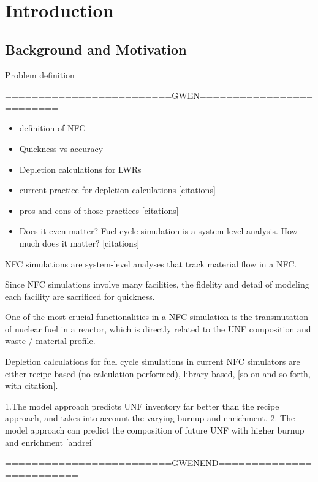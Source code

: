 \section{Introduction}
\subsection{Background and Motivation}
Problem definition

=========================GWEN=========================
\begin{itemize}
    \item definition of NFC
    \item Quickness vs accuracy
    \item Depletion calculations for LWRs
    \item current practice for depletion calculations [citations]
    \item pros and cons of those practices [citations]
    \item Does it even matter? Fuel cycle simulation is a system-level analysis. How much does it matter? [citations]
\end{itemize}


\gls{NFC} simulations are system-level analyses that track
material flow in a \gls{NFC}. 

Since \gls{NFC} simulations
involve many facilities, the fidelity and detail of modeling each
facility are sacrificed for quickness. 

One of the most crucial functionalities in a \gls{NFC}
simulation is the transmutation of nuclear fuel in a reactor,
which is directly related to the \gls{UNF} composition
and waste / material profile.

Depletion calculations for fuel cycle simulations in current
\gls{NFC} simulators are either
recipe based (no calculation performed), 
library based, [so on and so forth, with citation].



1.The model approach predicts \gls{UNF} inventory far better than
the recipe approach, and takes into account the varying burnup and
enrichment.
2. The model approach can predict the composition of future
\gls{UNF} with higher burnup and enrichment [andrei]

=========================GWENEND=========================

\subsection{\Cyclus}

